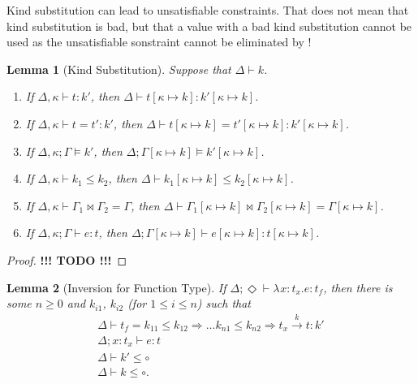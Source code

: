 \documentclass{article}
\newcommand{\KVAR}{\kappa}
\newcommand{\ONE}{\circ}
\newcommand{\TASS}[1]{#1\colon\!}
\newcommand{\LAM}[3][{}]{\lambda^{#1}\TASS{#2}#3.}
\newcommand{\KENV}{\Delta}
\newcommand{\TENV}{\Gamma}
\newcommand{\TENVEMPTY}{\Diamond}
\newcommand{\SPLIT}[3]{#1 \Join #2 = #3}
\newtheorem{lemma}{Lemma}
\begin{document}
Kind substitution can lead to unsatisfiable constraints. That does not
mean that kind substitution is bad, but that a value with a bad kind
substitution cannot be used as the unsatisfiable sonstraint cannot be
eliminated by !
\begin{lemma}[Kind Substitution]\label{lemma:kind-substitution}
  Suppose that $\KENV \vdash k$.
  \begin{enumerate}
  \item If $\KENV, \KVAR \vdash t : k'$,
    then $\KENV \vdash t[\KVAR \mapsto k] : k'[\KVAR \mapsto k]$.
  \item If $\KENV, \KVAR \vdash t = t' : k'$,
    then $\KENV \vdash t[\KVAR \mapsto k] = t'[\KVAR \mapsto k] : k'[\KVAR \mapsto k]$.
  \item If $\KENV, \KVAR ; \TENV \models k'$,
    then $\KENV; \TENV[\KVAR \mapsto k] \models k'[\KVAR \mapsto k]$.
  \item If $\KENV,\KVAR \vdash k_1 \le k_2$,
    then $\KENV \vdash k_1[\KVAR \mapsto k] \le k_2[\KVAR \mapsto k]$.
  \item If $\KENV, \KVAR \vdash \SPLIT{\TENV_1}{\TENV_2}{\TENV}$,
    then $\KENV \vdash \SPLIT{\TENV_1[\KVAR \mapsto k]}{\TENV_2[\KVAR \mapsto k]}{\TENV[\KVAR \mapsto k]}$. 
  \item If $\KENV, \KVAR; \TENV \vdash e : t$,
    then $\KENV; \TENV[\KVAR \mapsto k] \vdash e[\KVAR \mapsto k] : t[\KVAR \mapsto k]$.
  \end{enumerate}
\end{lemma}
\begin{proof}
  \textbf{!!! TODO !!!}
\end{proof}
\begin{lemma}[Inversion for Function Type]\label{lemma:inversion-function}
  If $\KENV; \TENVEMPTY \vdash \LAM x {t_x} e : t_f$,
  then there is some $n\ge0$ and $k_{i1}$, $k_{i2}$ (for $1\le i\le n$) such that 
  \begin{gather}
    \KENV \vdash t_f = k_{11}\le k_{12}\Rightarrow \dots k_{n1}\le k_{n2} \Rightarrow t_x \stackrel{k}\to t : k'
    \\
    \KENV; \TASS x{t_x} \vdash e : t
    \\
    \KENV \vdash k' \le \ONE
    \\
    \KENV \vdash k \le \ONE
    \mathrm{.}
  \end{gather}
\end{lemma}
\end{document}
